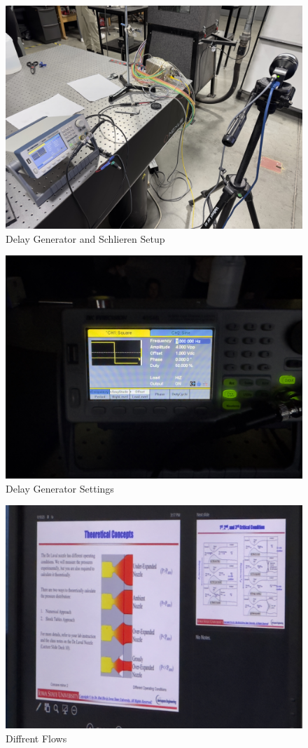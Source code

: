 \begin{figure}[htpb]
    \centering
    \includegraphics[width=0.75\linewidth]{Figures/delay_generator_and_schlieren.jpeg}
    \caption[Delay Generator and Schlieren Settup]{Delay Generator and Schlieren Setup}
    \label{fig: delayGeneratoandSchlieren}
\end{figure}

\begin{figure}[htpb]
    \centering
    \includegraphics[width=0.75\linewidth]{Figures/delay_generator_settings.jpeg}
    \caption[Delay Generator Settings]{Delay Generator Settings}
    \label{fig: delayGeneratorsettings}
\end{figure}

\begin{figure}[htpb]
    \centering
    \includegraphics[width=0.75\linewidth]{Figures/different_flows.jpeg}
    \caption[Different Flows]{Diffrent Flows}
    \label{fig: DiffrentFlows}
\end{figure}


